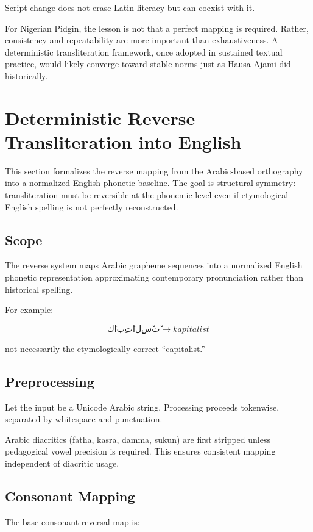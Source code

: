 \documentclass[12pt]{article}
\begin{document}
Script change does not erase Latin literacy but can coexist with it.

For Nigerian Pidgin, the lesson is not that a perfect mapping is required. Rather, consistency and repeatability are more important than exhaustiveness. A deterministic transliteration framework, once adopted in sustained textual practice, would likely converge toward stable norms just as Hausa Ajami did historically.

\section{Deterministic Reverse Transliteration into English}

This section formalizes the reverse mapping from the Arabic-based orthography into a normalized English phonetic baseline. The goal is structural symmetry: transliteration must be reversible at the phonemic level even if etymological English spelling is not perfectly reconstructed.

\subsection{Scope}

The reverse system maps Arabic grapheme sequences into a normalized English phonetic representation approximating contemporary pronunciation rather than historical spelling.

For example:

\[
كَابِتَالِسْتْ \rightarrow kapitalist
\]

not necessarily the etymologically correct ``capitalist.''

\subsection{Preprocessing}

Let the input be a Unicode Arabic string. Processing proceeds tokenwise, separated by whitespace and punctuation.

Arabic diacritics (fatha, kasra, damma, sukun) are first stripped unless pedagogical vowel precision is required. This ensures consistent mapping independent of diacritic usage.

\subsection{Consonant Mapping}

The base consonant reversal map is:
\end{document}
